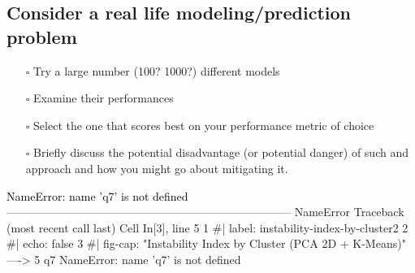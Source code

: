 \documentclass[
  letterpaper,
  DIV=11,
  numbers=noendperiod]{scrartcl}
\providecommand{\tightlist}{%
  \setlength{\itemsep}{0pt}\setlength{\parskip}{0pt}}\usepackage{longtable,booktabs,array}
\begin{document}
\subsection{Consider a real life modeling/prediction
problem}\label{consider-a-real-life-modelingprediction-problem}

\begin{itemize}
\tightlist
\item[$\square$]
  Try a large number (100? 1000?) different models
\item[$\square$]
  Examine their performances
\item[$\square$]
  Select the one that scores best on your performance metric of choice
\item[$\square$]
  Briefly discuss the potential disadvantage (or potential danger) of
  such and approach and how you might go about mitigating it.
\end{itemize}

\label{instability-index-by-cluster2}
\begin{Highlighting}
\textcolor{black}{NameError: name 'q7' is not defined}
\textcolor{black}{}\textcolor{QuartoInternalColor1}{---------------------------------------------------------------------------}\textcolor{QuartoInternalColor2}{}
\textcolor{QuartoInternalColor2}{}\textcolor{QuartoInternalColor1}{NameError}\textcolor{QuartoInternalColor2}{                                 Traceback (most recent call last)}
\textcolor{QuartoInternalColor2}{Cell }\textcolor{QuartoInternalColor3}{In[3], line 5}\textcolor{QuartoInternalColor2}{}
\textcolor{QuartoInternalColor2}{}\textcolor{QuartoInternalColor4}{      1}\textcolor{QuartoInternalColor2}{ }\textcolor{QuartoInternalColor9}{#| label: instability-index-by-cluster2}\textcolor{QuartoInternalColor2}{}
\textcolor{QuartoInternalColor2}{}\textcolor{QuartoInternalColor4}{      2}\textcolor{QuartoInternalColor2}{ }\textcolor{QuartoInternalColor9}{#| echo: false}\textcolor{QuartoInternalColor2}{}
\textcolor{QuartoInternalColor2}{}\textcolor{QuartoInternalColor4}{      3}\textcolor{QuartoInternalColor2}{ }\textcolor{QuartoInternalColor9}{#| fig-cap: "Instability Index by Cluster (PCA 2D + K-Means)"}\textcolor{QuartoInternalColor2}{}
\textcolor{QuartoInternalColor2}{}\textcolor{QuartoInternalColor3}{----> 5}\textcolor{QuartoInternalColor2}{ }\textcolor{QuartoInternalColor2}{q7}\textcolor{QuartoInternalColor2}{}
\textcolor{QuartoInternalColor2}{}\textcolor{QuartoInternalColor1}{NameError}\textcolor{QuartoInternalColor2}{: name 'q7' is not defined}
\end{Highlighting}
\end{document}
